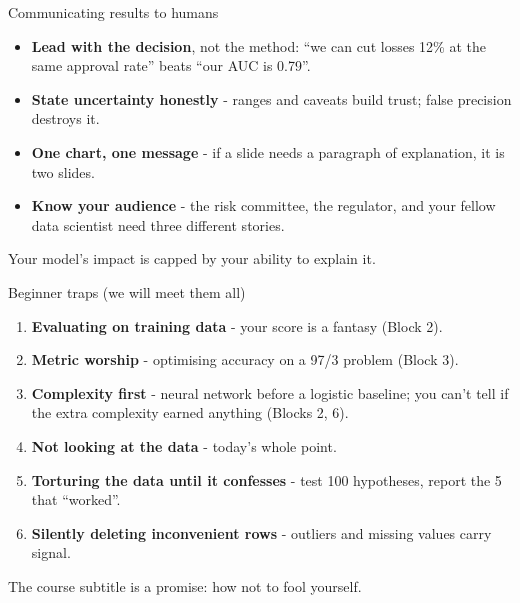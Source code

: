 \documentclass[10pt,aspectratio=169]{beamer}
\begin{document}
\begin{frame}{Communicating results to humans}
  \begin{itemize}
    \item \textbf{Lead with the decision}, not the method: ``we can cut losses
          12\% at the same approval rate'' beats ``our AUC is 0.79''.
    \item \textbf{State uncertainty honestly} - ranges and caveats build
          trust; false precision destroys it.
    \item \textbf{One chart, one message} - if a slide needs a paragraph of
          explanation, it is two slides.
    \item \textbf{Know your audience} - the risk committee, the regulator,
          and your fellow data scientist need three different stories.
  \end{itemize}
  \vspace{0.5em}
  \begin{center}
    Your model's impact is capped by your ability to \alert{explain} it.
  \end{center}
\end{frame}

\begin{frame}{Beginner traps (we will meet them all)}
  \begin{enumerate}
    \item \textbf{Evaluating on training data} - your score is a fantasy
          (Block 2).
    \item \textbf{Metric worship} - optimising accuracy on a 97/3 problem
          (Block 3).
    \item \textbf{Complexity first} - neural network before a logistic
          baseline; you can't tell if the extra complexity earned anything (Blocks 2, 6).
    \item \textbf{Not looking at the data} - today's whole point.
    \item \textbf{Torturing the data until it confesses} - test 100
          hypotheses, report the 5 that ``worked''.
    \item \textbf{Silently deleting inconvenient rows} - outliers and
          missing values carry signal.
  \end{enumerate}
  \vspace{0.4em}
  \begin{center}
    The course subtitle is a promise: \alert{how not to fool yourself}.
  \end{center}
\end{frame}
\end{document}
